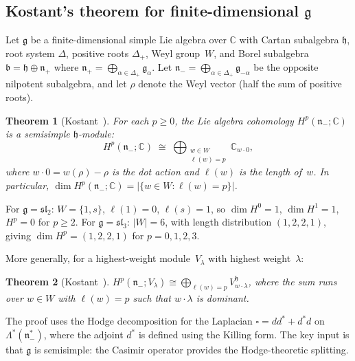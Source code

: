 \documentclass[11pt]{article}
\theoremstyle{plain}
\newtheorem{theorem}{Theorem}[section]
\theoremstyle{definition}
\theoremstyle{remark}
\newcommand{\fg}{\mathfrak{g}}
\newcommand{\fh}{\mathfrak{h}}
\newcommand{\fn}{\mathfrak{n}}
\newcommand{\fb}{\mathfrak{b}}
\newcommand{\fsl}{\mathfrak{sl}}
\numberwithin{equation}{section}
\begin{document}
\subsection{Kostant's theorem for finite-dimensional \texorpdfstring{$\fg$}{g}}

Let $\fg$ be a finite-dimensional simple Lie algebra over
$\mathbb{C}$ with Cartan subalgebra $\fh$, root system
$\Delta$, positive roots $\Delta_+$, Weyl group~$W$,
and Borel subalgebra $\fb = \fh \oplus \fn_+$ where
$\fn_+ = \bigoplus_{\alpha \in \Delta_+} \fg_\alpha$.
Let $\fn_- = \bigoplus_{\alpha \in \Delta_+} \fg_{-\alpha}$
be the opposite nilpotent subalgebra, and let $\rho$ denote
the Weyl vector (half the sum of positive roots).

\begin{theorem}[Kostant~\cite{Kostant61}]\label{thm:kostant}
For each $p \geq 0$, the Lie algebra cohomology
$H^p(\fn_-; \mathbb{C})$ is a semisimple $\fh$-module:
\begin{equation}\label{eq:kostant}
H^p(\fn_-; \mathbb{C})
\;\cong\; \bigoplus_{\substack{w \in W \\ \ell(w) = p}}
\mathbb{C}_{w \cdot 0},
\end{equation}
where $w \cdot 0 = w(\rho) - \rho$ is the dot action and
$\ell(w)$ is the length of~$w$. In particular,
$\dim H^p(\fn_-; \mathbb{C}) = |\{w \in W : \ell(w) = p\}|$.
\end{theorem}

For $\fg = \fsl_2$: $W = \{1, s\}$, $\ell(1) = 0$,
$\ell(s) = 1$, so $\dim H^0 = 1$, $\dim H^1 = 1$,
$H^p = 0$ for $p \geq 2$. For $\fg = \fsl_3$:
$|W| = 6$, with length distribution $(1, 2, 2, 1)$, giving
$\dim H^p = (1, 2, 2, 1)$ for $p = 0, 1, 2, 3$.

More generally, for a highest-weight module~$V_\lambda$ with
highest weight~$\lambda$:

\begin{theorem}[Kostant~\cite{Kostant61}]\label{thm:kostant-general}
$H^p(\fn_-; V_\lambda)
\cong \bigoplus_{\ell(w) = p} V_{w \cdot \lambda}^{\fh}$,
where the sum runs over $w \in W$ with $\ell(w) = p$ such that
$w \cdot \lambda$ is dominant.
\end{theorem}

The proof uses the Hodge decomposition for the Laplacian
$\square = dd^* + d^*d$ on $\Lambda^*(\fn_-^*)$, where the
adjoint $d^*$ is defined using the Killing form. The key
input is that $\fg$ is semisimple: the Casimir operator
provides the Hodge-theoretic splitting.
\end{document}
